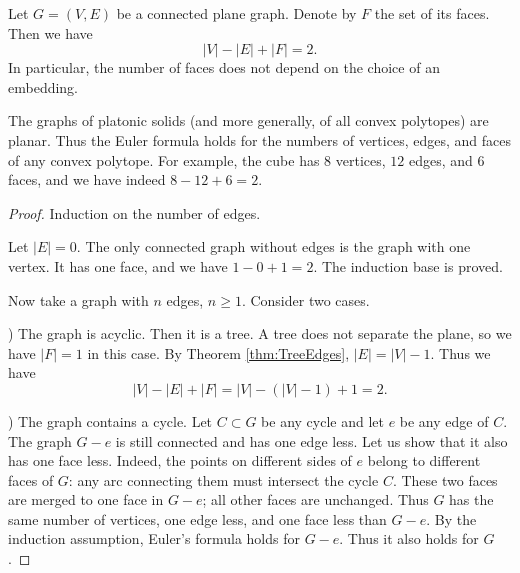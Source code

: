\begin{page}

\begin{thm}[Euler]
Let $G = (V, E)$ be a connected plane graph.
Denote by $F$ the set of its faces.
Then we have
\[
|V| - |E| + |F| = 2.
\]
In particular, the number of faces does not depend on the choice of an embedding.
\end{thm}

\end{page}

\begin{page}

\begin{exl}
The graphs of platonic solids (and more generally, of all convex polytopes) are planar.
Thus the Euler formula holds for the numbers of vertices, edges, and faces of any convex polytope.
For example, the cube has $8$ vertices, $12$ edges, and $6$ faces, and we have indeed $8-12+6=2$.
\end{exl}

\end{page}

\begin{page}


\begin{proof}
Induction on the number of edges.

Let $|E| = 0$. The only connected graph without edges is the graph with one vertex.
It has one face, and we have $1 - 0 + 1 = 2$. The induction base is proved.

Now take a graph with $n$ edges, $n \ge 1$.
Consider two cases.

) The graph is acyclic.
Then it is a tree. A tree does not separate the plane, so we have $|F| = 1$ in this case.
By Theorem \ref{thm:TreeEdges}, $|E| = |V|-1$.
Thus we have
\[
|V| - |E| + |F| = |V| - (|V|-1) + 1 = 2.
\]

) The graph contains a cycle.
Let $C \subset G$ be any cycle and let $e$ be any edge of $C$.
The graph $G - e$ is still connected and has one edge less.
Let us show that it also has one face less.
Indeed, the points on different sides of $e$ belong to different faces of $G$:
any arc connecting them must intersect the cycle $C$.
These two faces are merged to one face in $G - e$; all other faces are unchanged.
Thus $G$ has the same number of vertices, one edge less, and one face less than $G - e$.
By the induction assumption, Euler's formula holds for $G - e$.
Thus it also holds for $G$.
\end{proof}



\end{page}

